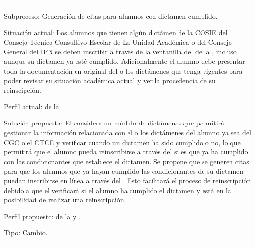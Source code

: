 \hrule
\vspace{0.2cm}
\begin{Cdescription}
	\item[Subproceso:] Generación de citas para alumnos con dictamen cumplido.
	\item[Situación actual:] Los alumnos que tienen algún dictámen de la COSIE del Consejo Técnico Consultivo Escolar de La Unidad Académica o del Consejo General del IPN se deben inscribir a través de la ventanilla del  de la , incluso aunque su dictamen ya esté cumplido. Adicionalmente el alumno debe presentar toda la documentación en original del o los dictámenes que tenga vigentes para poder revisar su situación académica actual y ver la procedencia de su reinscipción.
	\item[Perfil actual:]  de la 
	\item[Solución propuesta:] El  considera un módulo de dictámenes que permitirá gestionar la información relacionada con el o los dictámenes del alumno ya sea del CGC o el CTCE y verificar cuando un dictamen ha sido cumplido o no, lo que permitirá que el alumno pueda reinscribirse a través del  si es que ya ha cumplido con las condicionantes que establece el dictamen. Se propone que se generen citas para que los alumnos que ya hayan cumplido las condicionantes de su dictamen puedan inscribirse en línea a través del . Esto facilitará el proceso de reinscripción debido a que el  verificará si el alumno ha cumplido el dictamen y está en la posibilidad de realizar una reinscripción.
	
	\item[Perfil propuesto:]  de la  y .
	\item[Tipo:] Cambio.\\
	
\end{Cdescription}
\hrule


